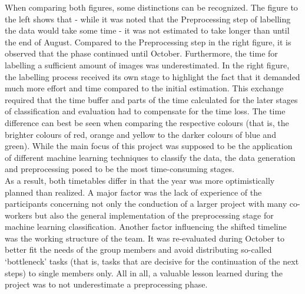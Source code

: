 When comparing both figures, some distinctions can be recognized. The figure to the left shows that - while it was noted that the Preprocessing step of labelling the data would take some time - it was not estimated to take longer than until the end of August. Compared to the Preprocessing step in the right figure, it is observed that the phase continued until October. Furthermore, the time for labelling a sufficient amount of images was underestimated. In the right figure, the labelling process received its own stage to highlight the fact that it demanded much more effort and time compared to the initial estimation.
This exchange required that the time buffer and parts of the time calculated for the later stages of classification and evaluation had to compensate for the time loss.
The time difference can best be seen when comparing the respective colours (that is, the brighter colours of red, orange and yellow to the darker colours of blue and green). While the main focus of this project was supposed to be the application of different machine learning techniques to classify the data, the data generation and preprocessing posed to be the most time-consuming stages. \\
As a result, both timetables differ in that the year was more optimistically planned than realized. A major factor was the lack of experience of the participants concerning not only the conduction of a larger project with many co-workers but also the general implementation of the preprocessing stage for machine learning classification. Another factor influencing the shifted timeline was the working structure of the team. It was re-evaluated during October to better fit the needs of the group members and avoid distributing so-called ‘bottleneck’ tasks (that is, tasks that are decisive for the continuation of the next steps) to single members only. All in all, a valuable lesson learned during the project was to not underestimate a preprocessing phase. \\

